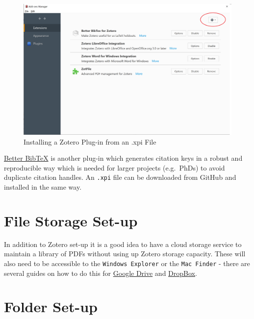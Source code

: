 \documentclass[
]{book}
\begin{document}
\begin{figure}
\includegraphics[width=36.78in]{img/zotero_add_on_install} \caption{Installing a Zotero Plug-in from an .xpi File}\label{fig:add-on-install}
\end{figure}

\href{https://github.com/retorquere/zotero-better-bibtex/releases/tag/v5.1.76}{Better BibTeX} is another plug-in which generates citation keys in a robust and reproducible way which is needed for larger projects (e.g.~PhDs) to avoid duplicate citation handles. An \texttt{.xpi} file can be downloaded from GitHub and installed in the same way.

\hypertarget{file-storage-set-up}{%
\section{File Storage Set-up}\label{file-storage-set-up}}

In addition to Zotero set-up it is a good idea to have a cloud storage service to maintain a library of PDFs without using up Zotero storage capacity. These will also need to be accessible to the \texttt{Windows\ Explorer} or the \texttt{Mac\ Finder} - there are several guides on how to do this for \href{https://www.howtogeek.com/228989/how-to-use-the-desktop-google-drive-app/}{Google Drive} and \href{https://www.dropboxforum.com/t5/Installation-and-desktop-app/How-do-I-put-Dropbox-on-my-File-Explorer-in-Win-10/td-p/313031}{DropBox}.

\hypertarget{folder-set-up}{%
\section{Folder Set-up}\label{folder-set-up}}
\end{document}
